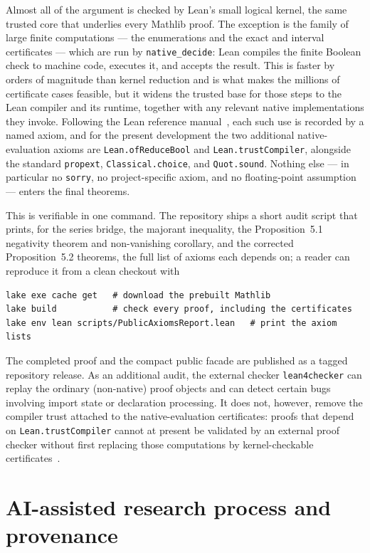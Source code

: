 \documentclass[11pt]{article}
\theoremstyle{definition}
\theoremstyle{remark}
\newcommand{\code}[1]{\texttt{#1}}
\begin{document}
Almost all of the argument is checked by Lean's small logical kernel, the same
trusted core that underlies every Mathlib proof.  The exception is the family of
large finite computations --- the enumerations and the exact and interval
certificates --- which are run by \code{native\_decide}: Lean compiles the
finite Boolean check to machine code, executes it, and accepts the result.
This is faster by orders of magnitude than kernel reduction and is what makes
the millions of certificate cases feasible, but it widens the trusted base for
those steps to the Lean compiler and its runtime, together with any relevant
native implementations they invoke.  Following the Lean reference
manual~\cite{LeanAxioms}, each such use is recorded by a named axiom, and for
the present development the two additional native-evaluation axioms are
\code{Lean.ofReduceBool} and \code{Lean.trustCompiler}, alongside the standard
\code{propext}, \code{Classical.choice}, and \code{Quot.sound}.  Nothing else ---
in particular no \code{sorry}, no project-specific axiom, and no floating-point
assumption --- enters the final theorems.

This is verifiable in one command.  The repository ships a short audit script
that prints, for the series bridge, the majorant inequality, the
Proposition~5.1 negativity theorem and non-vanishing corollary, and the corrected
Proposition~5.2 theorems, the full list of axioms each depends on; a reader can
reproduce it from a clean checkout with
\begin{lstlisting}
lake exe cache get   # download the prebuilt Mathlib
lake build           # check every proof, including the certificates
lake env lean scripts/PublicAxiomsReport.lean   # print the axiom lists
\end{lstlisting}
The completed proof and the compact public facade are published as a tagged
repository release.  As an additional audit, the external checker
\code{lean4checker} can replay the ordinary (non-native) proof objects and can
detect certain bugs involving import state or declaration processing.  It does
not, however, remove the compiler trust attached to the native-evaluation
certificates: proofs that depend on \code{Lean.trustCompiler} cannot at present
be validated by an external proof checker without first replacing those
computations by kernel-checkable certificates~\cite{LeanAxioms}.

\section{AI-assisted research process and provenance}\label{sec:ai}
\end{document}
